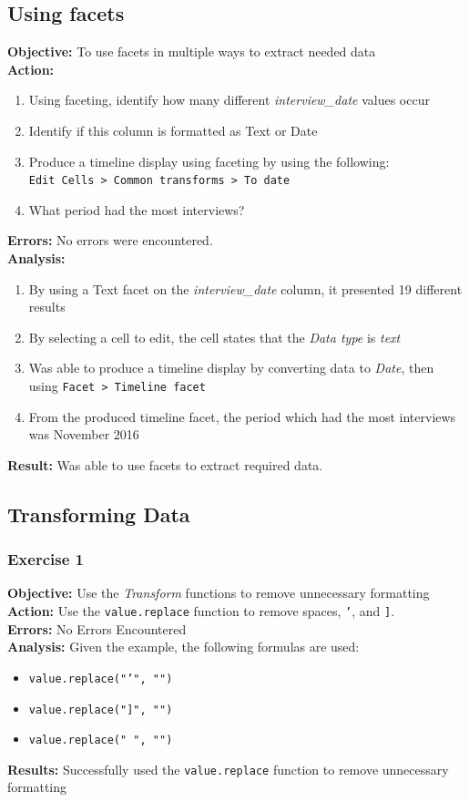 \documentclass{article}
\begin{document}
\subsection{Using facets}
\textbf{Objective:} To use facets in multiple ways to extract needed data\\
\textbf{Action:}
\begin{enumerate}
    \item Using faceting, identify how many different \textit{interview\_date} values occur
    \item Identify if this column is formatted as Text or Date
    \item Produce a timeline display using faceting by using the following:\\
    \texttt{Edit Cells > Common transforms > To date}
    \item What period had the most interviews?
\end{enumerate}
\textbf{Errors:} No errors were encountered.\\
\textbf{Analysis:}
\begin{enumerate}
    \item By using a Text facet on the \textit{interview\_date} column, it presented 19 different results
    \item By selecting a cell to edit, the cell states that the \textit{Data type} is \textit{text}
    \item Was able to produce a timeline display by converting data to \textit{Date}, then using \texttt{Facet > Timeline facet}
    \item From the produced timeline facet, the period which had the most interviews was November 2016
\end{enumerate}
\textbf{Result:} Was able to use facets to extract required data.
\subsection{Transforming Data}
\subsubsection{Exercise 1}
\textbf{Objective:} Use the \textit{Transform} functions to remove unnecessary formatting\\
\textbf{Action:} Use the \texttt{value.replace} function to remove spaces, \texttt{'}, and \texttt{]}.\\
\textbf{Errors:} No Errors Encountered\\
\textbf{Analysis:} Given the example, the following formulas are used:
\begin{itemize}
    \item \texttt{value.replace("'", "")}
    \item \texttt{value.replace("]", "")}
    \item \texttt{value.replace(" ", "")}
\end{itemize}
\textbf{Results:} Successfully used the \texttt{value.replace} function to remove unnecessary formatting
\end{document}
